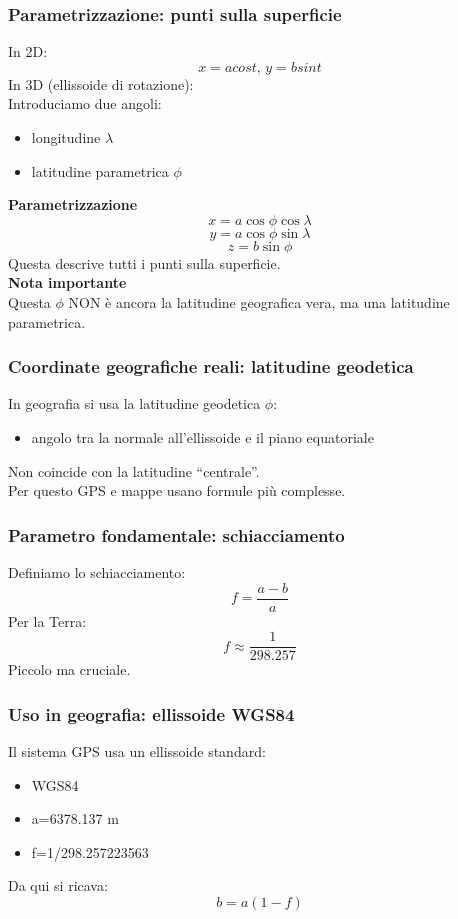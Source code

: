 \documentclass[a4paper,14pt]{article}
\begin{document}
\subsubsection{Parametrizzazione: punti sulla superficie}
In 2D:\\
\[ x=acos⁡t,\,y=bsin⁡t \]
In 3D (ellissoide di rotazione):\\
Introduciamo due angoli:\\
\begin{itemize}
\item longitudine \(\lambda\)
\item latitudine parametrica \(\phi\)
\end{itemize}
\textbf{Parametrizzazione}
\[ x=a\cos⁡\phi\cos⁡\lambda \]
\[ y=a\cos\phi\sin⁡\lambda \]
\[z=b\sin⁡\phi \]
Questa descrive tutti i punti sulla superficie.\\
\textbf{Nota importante}\\
Questa \(\phi\) NON è ancora la latitudine geografica vera, ma una latitudine parametrica.\\
\subsubsection{Coordinate geografiche reali: latitudine geodetica}
In geografia si usa la latitudine geodetica \(\phi\):\\
\begin{itemize}
\item angolo tra la normale all’ellissoide e il piano equatoriale
\end{itemize}
Non coincide con la latitudine “centrale”.\\
Per questo GPS e mappe usano formule più complesse.\\
\subsubsection{Parametro fondamentale: schiacciamento}
Definiamo lo schiacciamento:\\
\[ f=\frac{a-b}{a}\]
Per la Terra:\\
\[f \approx \frac{1}{298.257}\]
Piccolo ma cruciale.
\subsubsection{Uso in geografia: ellissoide WGS84}
Il sistema GPS usa un ellissoide standard:\\
\begin{itemize}
\item WGS84
\end{itemize}
\begin{itemize}
\item a=6378.137 m
\item f=1/298.257223563
\end{itemize}
Da qui si ricava:\\
\[ b=a(1-f) \]
\end{document}
